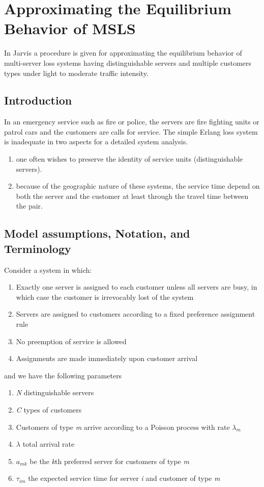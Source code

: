 
\chapter{Approximating the Equilibrium Behavior of MSLS}
In Jarvis \cite{jarvis1985approximating}
a procedure is given
for approximating the equilibrium behavior
of multi-server loss systems having distinguishable servers
and multiple customers types
under light to moderate traffic intensity.

\section{Introduction}
In an emergency service such as fire or police, 
the servers are fire fighting units or patrol cars
and the customers are calls for service.
The simple Erlang loss system
is inadequate in two aspects for a detailed system analysis.
\begin{enumerate}
\item one often wishes
  to preserve the identity of service units (distinguishable servers).
\item because
  of the geographic nature of these systems,
  the service time depend on both
  the server and the customer
  at least through the travel time between the pair.
\end{enumerate}

\section{Model assumptions, Notation, and Terminology}
Consider a system in which:
\begin{enumerate}
\item Exactly one server
  is assigned to each customer
  unless all servers are busy, 
  in which case
  the customer is irrevocably lost of the system
\item Servers are assigned
  to customers according to a fixed preference assignment rule
\item No preemption of service is allowed
\item Assignments are made immediately
  upon customer arrival
\end{enumerate}

and we have the following parameters
\begin{enumerate}
\item \textit{N} distinguishable servers
\item \textit{C} types of customers
\item Customers of type \textit{m}
  arrive according to a Poisson process with rate $\lambda_{m}$
\item $\lambda$ total arrival rate
\item $a_{mk}$ be the \textit{k}th preferred server
  for customers of type \textit{m}
\item $\tau_{im}$ the expected service time
  for server \textit{i} and customer of type \textit{m}
\end{enumerate}


